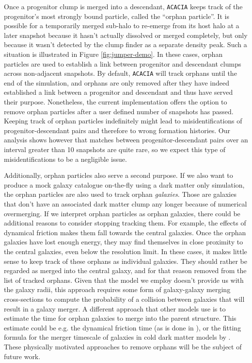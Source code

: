 Once a progenitor  clump is merged into  a descendant, \texttt{ACACIA}
keeps track of the progenitor's most strongly bound particle, called the
``orphan particle''.  It is possible for a temporarily merged sub-halo
to re-emerge from its host halo  at a later snapshot because it hasn't
actually dissolved  or merged completely,  but only because  it wasn't
detected  by the  clump finder  as a  separate density  peak.  Such  a
situation  is illustrated  in Figure  \ref{fig:jumper-demo}. In  these
cases,  orphan  particles  are  used   to  establish  a  link  between
progenitor  and  descendant   clumps  across  non-adjacent  snapshots.
By  default, \texttt{ACACIA} will track orphans until the end of the 
simulation, and orphans are only removed after they have indeed established
a link between a progenitor and descendant and thus have served their
purpose. Nonetheless, the current implementation 
offers the option to remove orphan particles after a user defined number
of snapshots has passed. Keeping track of orphan particles indefinitely
might lead to misidentifications of progenitor-descendant pairs and 
therefore to wrong formation histories. Our analysis shows however that 
matches between progenitor-descendant pairs over an interval greater 
than 10 snapshots are quite rare, so we expect this type of 
misidentifications to be a negligible issue. 

Additionally, orphan particles also serve a second  purpose. If we also
want to produce a mock galaxy catalogue on-the-fly using a dark matter
only simulation, the orphan particles are also used to track orphan
\emph{galaxies}. Those are  galaxies that  don't have  an associated
dark  matter  clump  any  longer  because  of  numerical  overmerging.
If we interpret orphan particles as orphan galaxies, there could be 
additional reasons to consider stopping tracking them. For example, the
effects of dynamical friction makes them fall towards the central 
galaxies. Once the orphan galaxies have lost enough energy, they may 
find themselves in close proximity to the central galaxies, even below 
the resolution limit. In these cases, it makes little sense to keep 
track of these orphans as individual galaxies. They should rather be 
regarded as merged into the central galaxy, and for that reason removed 
from the list of tracked orphans. Given that the model we employ
doesn't provide us with the galaxy radii, this approach requires some 
form of galaxy-galaxy merging cross-sections to compute the probability
of a collision between galaxies that will result in a galaxy merger. 
A different approach that other models use is to estimate the time for 
orphan galaxies to merge into the parent structure. This estimate could 
be e.g. the dynamical friction time (as is done in \citet{Moster}), or 
the fitting formula for the merger timescale of galaxies in cold dark 
matter models by \citet{merger_timescales}. These physically motivated
approaches to remove orphans will be the subject of future work.



